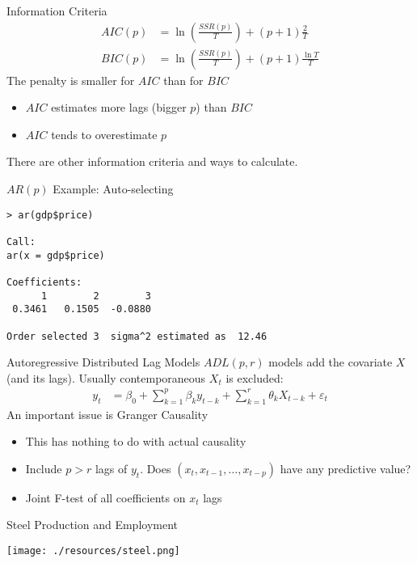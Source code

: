 \documentclass[aspectratio=169]{beamer}
\begin{document}
\begin{frame}{Information Criteria}
\begin{align*}
AIC(p) &= \ln \left(\frac{SSR(p)}{T} \right) + (p+1) \frac{2}{T}\\
BIC(p) &= \ln \left(\frac{SSR(p)}{T} \right) + (p+1) \frac{\ln T}{T}
\end{align*}
The penalty is smaller for $AIC$ than for $BIC$
\begin{itemize}
  \item $AIC$ estimates more lags (bigger $p$) than $BIC$
  \item $AIC$ tends to overestimate $p$
\end{itemize}
There are other information criteria and ways to calculate.
\end{frame}

\begin{frame}[fragile]{$AR(p)$ Example: Auto-selecting}
\begin{verbatim}
> ar(gdp$price)

Call:
ar(x = gdp$price)

Coefficients:
      1        2        3  
 0.3461   0.1505  -0.0880  

Order selected 3  sigma^2 estimated as  12.46
\end{verbatim}
\end{frame}

\begin{frame}{Autoregressive Distributed Lag Models}
$ADL(p,r)$ models add the covariate $X$ (and its lags). Usually contemporaneous $X_t$ is excluded:
\begin{align*}
y_t &= \beta_0 + \sum_{k=1}^p \beta_k y_{t-k} + \sum_{k=1}^r \theta_k X_{t-k} + \varepsilon_t
\end{align*}
An important issue is \alert{Granger Causality}
\begin{itemize}
\item This has \alert{nothing to do} with actual causality
\item Include $p>r$ lags of $y_t$. Does $(x_t,x_{t-1},\ldots,x_{t-p})$ have any predictive value?
\item Joint F-test of all coefficients on $x_t$ lags
\end{itemize}
\end{frame}

\begin{frame}{Steel Production and Employment}
\begin{center}
\texttt{[image: ./resources/steel.png]}
\end{center}
\end{frame}
\end{document}
